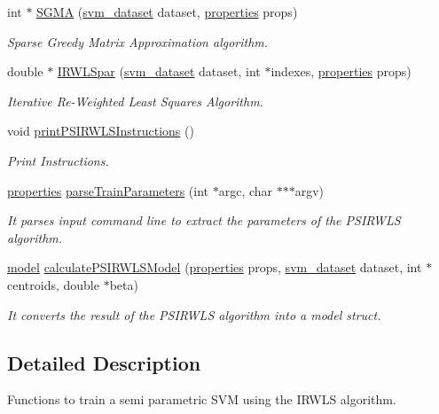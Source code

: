 \begin{DoxyCompactItemize}
\item 
int $\ast$ \hyperlink{PSIRWLS-train_8h_a50a6e1f36a010feb91db9b9b38679948}{S\+G\+MA} (\hyperlink{structsvm__dataset}{svm\+\_\+dataset} dataset, \hyperlink{structproperties}{properties} props)
\begin{DoxyCompactList}\small\item\em Sparse Greedy Matrix Approximation algorithm. \end{DoxyCompactList}\item 
double $\ast$ \hyperlink{PSIRWLS-train_8h_ad51d9a46645ad0b0bedb1113a3807d24}{I\+R\+W\+L\+Spar} (\hyperlink{structsvm__dataset}{svm\+\_\+dataset} dataset, int $\ast$indexes, \hyperlink{structproperties}{properties} props)
\begin{DoxyCompactList}\small\item\em Iterative Re-\/\+Weighted Least Squares Algorithm. \end{DoxyCompactList}\item 
void \hyperlink{PSIRWLS-train_8h_af71e97e89750872ce608bffd01d2af41}{print\+P\+S\+I\+R\+W\+L\+S\+Instructions} ()
\begin{DoxyCompactList}\small\item\em Print Instructions. \end{DoxyCompactList}\item 
\hyperlink{structproperties}{properties} \hyperlink{PSIRWLS-train_8h_a67566f6fd6aec7278ca360186af4e91b}{parse\+Train\+Parameters} (int $\ast$argc, char $\ast$$\ast$$\ast$argv)
\begin{DoxyCompactList}\small\item\em It parses input command line to extract the parameters of the P\+S\+I\+R\+W\+LS algorithm. \end{DoxyCompactList}\item 
\hyperlink{structmodel}{model} \hyperlink{PSIRWLS-train_8h_a71b4329438bbf3210414315619f7b804}{calculate\+P\+S\+I\+R\+W\+L\+S\+Model} (\hyperlink{structproperties}{properties} props, \hyperlink{structsvm__dataset}{svm\+\_\+dataset} dataset, int $\ast$centroids, double $\ast$beta)
\begin{DoxyCompactList}\small\item\em It converts the result of the P\+S\+I\+R\+W\+LS algorithm into a model struct. \end{DoxyCompactList}\end{DoxyCompactItemize}


\subsection{Detailed Description}
Functions to train a semi parametric S\+VM using the I\+R\+W\+LS algorithm. 

